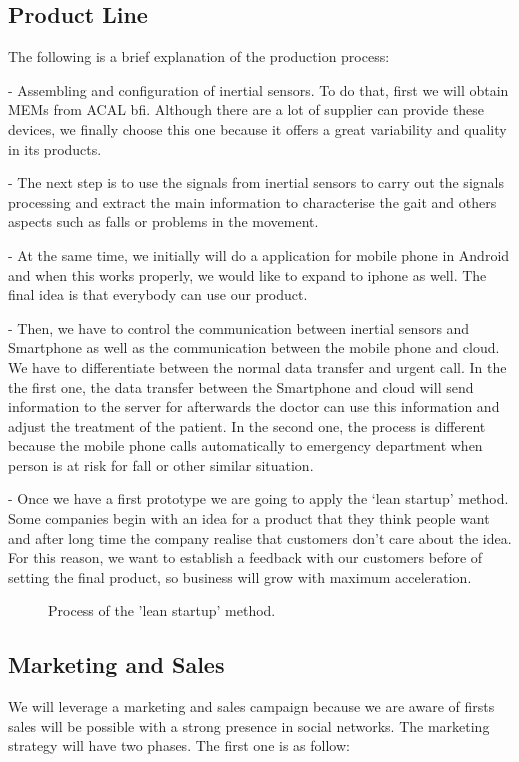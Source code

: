\subsection{Product Line}
The following is a brief explanation of the production process:

-	Assembling and configuration of inertial sensors. To do that, first we will obtain MEMs from ACAL bfi. Although there are a lot of supplier can provide these devices, we finally choose this one because it offers a great variability and quality in its products.

-	The next step is to use the signals from inertial sensors to carry out the signals processing and extract the main information to characterise the gait and others aspects such as falls or problems in the movement.

-	At the same time, we initially will do a application for mobile phone in Android and when this works properly, we would like to expand to iphone as well. The final idea is that everybody can use our product.

-	Then, we have to control the communication between inertial sensors and Smartphone as well as the communication between the mobile phone and cloud. We have to differentiate between the normal data transfer and urgent call. In the the first one, the data transfer between the Smartphone and cloud will send information to the server for afterwards the doctor can use this information and adjust the treatment of the patient. In the second one, the process is different because the mobile phone calls automatically to emergency department when person is at risk for fall or other similar situation.

-	Once we have a first prototype we are going to apply the ‘lean startup’ method. Some companies begin with an idea for a product that they think people want and after long time the company realise that customers don’t care about the idea. For this reason, we want to establish a feedback with our customers before of setting the final product, so  business will grow with maximum acceleration.

\begin{figure}[H]
	\centering
	\caption{Process of the 'lean startup' method.}
	\label{fig:leanstartup_diagram}
\end{figure}

\subsection{Marketing and Sales}
We will leverage a marketing and sales campaign because we are aware of firsts sales will be possible with a strong presence in social networks. The marketing strategy will have two phases. The first one is as follow:

